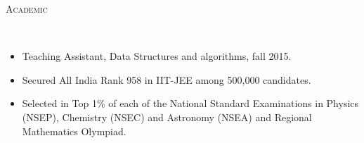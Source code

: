 \documentclass[9pt]{article}
\newenvironment{changemargin}[2]{%
  \begin{list}{}{%
    \setlength{\topsep}{0pt}%
    \setlength{\leftmargin}{#1}%
    \setlength{\rightmargin}{#2}%
    \setlength{\listparindent}{\parindent}%
    \setlength{\itemindent}{\parindent}%
    \setlength{\parsep}{\parskip}%
  }%
  \item[]}{\end{list}
}
\newcommand{\lineover}{
	\begin{changemargin}{-0.05in}{-0.10in}
		\vspace*{-9pt}
		\hrulefill \\
		\vspace*{-2pt}
	\end{changemargin}
}
\newcommand{\header}[1]{
	\begin{changemargin}{-0.5in}{-0.5in}
		\scshape{#1}\\
  	\lineover
	\end{changemargin}
}
\newenvironment{body} {
	\vspace*{-16pt}
	\begin{changemargin}{-0.6in}{-0.65in}
  }	
	{\end{changemargin}
}
\begin{document}

	  

\header{Academic}
\begin{body}
	\vspace{14pt}
	\begin{changemargin}{0.15in}{0.15in}
	\begin{itemize}
	  \item Teaching Assistant, Data Structures and algorithms, fall 2015.
	  \item Secured All India Rank 958 in IIT-JEE among 500,000 candidates.
	  \item Selected in Top 1\% of each of the National Standard Examinations in Physics (NSEP), Chemistry (NSEC) and Astronomy (NSEA) and Regional Mathematics Olympiad.
	\end{itemize}
	\end{changemargin}
\end{body}
\end{document}
